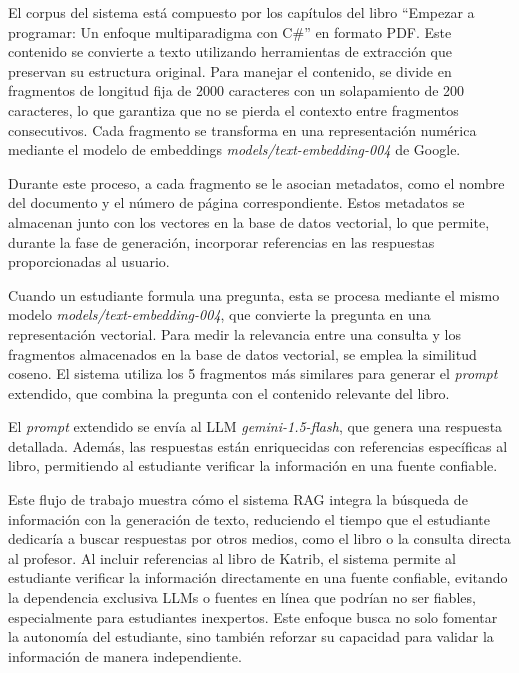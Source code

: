 \documentclass{article}
\begin{document}
El corpus del sistema está compuesto por los capítulos del libro ``Empezar a programar: Un enfoque multiparadigma con C\#'' en formato PDF. Este contenido se convierte a texto utilizando herramientas de extracción que preservan su estructura original. Para manejar el contenido, se divide en fragmentos de longitud fija de 2000 caracteres con un solapamiento de 200 caracteres, lo que garantiza que no se pierda el contexto entre fragmentos consecutivos. Cada fragmento se transforma en una representación numérica mediante el modelo de embeddings \textit{models/text-embedding-004} de Google.

Durante este proceso, a cada fragmento se le asocian metadatos, como el nombre del documento y el número de página correspondiente. Estos metadatos se almacenan junto con los vectores en la base de datos vectorial, lo que permite, durante la fase de generación, incorporar referencias en las respuestas proporcionadas al usuario.

Cuando un estudiante formula una pregunta, esta se procesa mediante el mismo modelo \textit{models/text-embedding-004}, que convierte la pregunta en una representación vectorial. Para medir la relevancia entre una consulta y los fragmentos almacenados en la base de datos vectorial, se emplea la similitud coseno. El sistema utiliza los 5 fragmentos más similares para generar el \textit{prompt} extendido, que combina la pregunta con el contenido relevante del libro.

El \textit{prompt} extendido se envía al LLM \textit{gemini-1.5-flash}, que genera una respuesta detallada. Además, las respuestas están enriquecidas con referencias específicas al libro, permitiendo al estudiante verificar la información en una fuente confiable.

Este flujo de trabajo muestra cómo el sistema RAG integra la búsqueda de información con la generación de texto, reduciendo el tiempo que el estudiante dedicaría a buscar respuestas por otros medios, como el libro o la consulta directa al profesor. Al incluir referencias al libro de Katrib, el sistema permite al estudiante verificar la información directamente en una fuente confiable, evitando la dependencia exclusiva LLMs o fuentes en línea que podrían no ser fiables, especialmente para estudiantes inexpertos. Este enfoque busca no solo fomentar la autonomía del estudiante, sino también reforzar su capacidad para validar la información de manera independiente.
\end{document}
